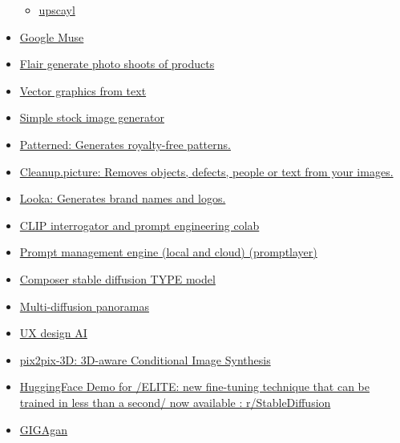 \begin{itemize}
  \begin{itemize}
   
  \item
    \href{https://github.com/upscayl/upscayl}{upscayl}
  \end{itemize}
\item
  \href{https://www.infoq.com/news/2023/01/google-muse-text-to-image/}{Google
  Muse}
\item
  \href{https://flair.ai/}{Flair generate photo shoots of products}
\item
  \href{https://illustroke.com/}{Vector graphics from text}
\item
  \href{https://stockimg.ai/}{Simple stock image generator}
\item
  \href{https://www.patterned.ai/}{Patterned: Generates royalty-free
  patterns.}
\item
  \href{https://cleanup.pictures/}{Cleanup.picture: Removes objects,
  defects, people or text from your images.}
\item
  \href{https://looka.com/}{Looka: Generates brand names and logos.}
\item
  \href{https://github.com/pharmapsychotic/clip-interrogator}{CLIP
  interrogator and prompt engineering colab}
\item
  \href{https://magniv.notion.site/PromptLayer-Docs-db0e6f50cacf4564a6d09824ba17a629}{Prompt
  management engine (local and cloud) (promptlayer)}
\item
  \href{https://github.com/damo-vilab/composer}{Composer stable
  diffusion TYPE model}
\item
  \href{https://multidiffusion.github.io/}{Multi-diffusion panoramas}
\item
  \href{https://www.usegalileo.ai/}{UX design AI}
\item
  \href{http://www.cs.cmu.edu/~pix2pix3D/}{pix2pix-3D: 3D-aware
  Conditional Image Synthesis}
\item
  \href{https://www.reddit.com/r/StableDiffusion/comments/11mzxyu/huggingface_demo_for_elite_new_finetuning/}{HuggingFace
  Demo for /ELITE: new fine-tuning technique that can be trained in less
  than a second/ now available : r/StableDiffusion}
\item
  \href{https://mingukkang.github.io/GigaGAN/}{GIGAgan}

  \begin{itemize}
   

\end{itemize}
\end{itemize}
